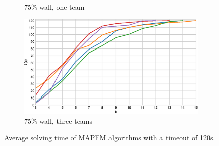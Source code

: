 \documentclass[english]{article}
\newcommand\graphwidth{0.49\textwidth}
\begin{document}
\begin{figure}[b]
\begin{subfigure}{\graphwidth}
			\caption{75\% wall, one team}
			\label{fig:r-75-1}
		\end{subfigure}
		\begin{subfigure}{\graphwidth}
			\centering
			\includegraphics[width=\linewidth]{img/results/relative-comparison/75-3}
			\caption{75\% wall, three teams}
			\label{fig:r-75-3}
		\end{subfigure}
		\caption{Average solving time of MAPFM algorithms with a timeout of 120s.}
		\label{fig:r-times}
	\end{figure}
	
	\restoregeometry
\end{document}
